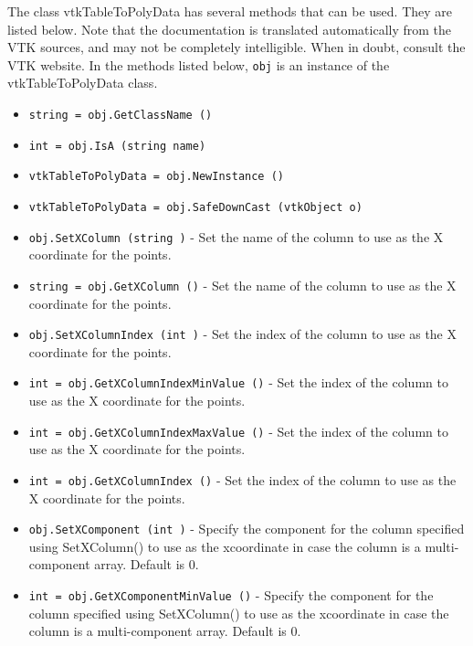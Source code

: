 The class vtkTableToPolyData has several methods that can be used.
  They are listed below.
Note that the documentation is translated automatically from the VTK sources,
and may not be completely intelligible.  When in doubt, consult the VTK website.
In the methods listed below, \verb|obj| is an instance of the vtkTableToPolyData class.
\begin{itemize}
\item  \verb|string = obj.GetClassName ()|

\item  \verb|int = obj.IsA (string name)|

\item  \verb|vtkTableToPolyData = obj.NewInstance ()|

\item  \verb|vtkTableToPolyData = obj.SafeDownCast (vtkObject o)|

\item  \verb|obj.SetXColumn (string )| -  Set the name of the column to use as the X coordinate for the points. 

\item  \verb|string = obj.GetXColumn ()| -  Set the name of the column to use as the X coordinate for the points. 

\item  \verb|obj.SetXColumnIndex (int )| -  Set the index of the column to use as the X coordinate for the points. 

\item  \verb|int = obj.GetXColumnIndexMinValue ()| -  Set the index of the column to use as the X coordinate for the points. 

\item  \verb|int = obj.GetXColumnIndexMaxValue ()| -  Set the index of the column to use as the X coordinate for the points. 

\item  \verb|int = obj.GetXColumnIndex ()| -  Set the index of the column to use as the X coordinate for the points. 

\item  \verb|obj.SetXComponent (int )| -  Specify the component for the column specified using SetXColumn() to
 use as the xcoordinate in case the column is a multi-component array.
 Default is 0.

\item  \verb|int = obj.GetXComponentMinValue ()| -  Specify the component for the column specified using SetXColumn() to
 use as the xcoordinate in case the column is a multi-component array.
 Default is 0.


\end{itemize}
